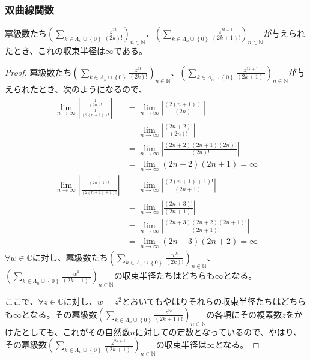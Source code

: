 \documentclass[dvipdfmx]{jsarticle}
\begin{document}
\subsubsection{双曲線関数}%
\begin{thm}\label{4.3.1.36}
冪級数たち$\left( \sum_{k \in \varLambda_{n} \cup \left\{ 0 \right\}} \frac{z^{2k}}{(2k)!} \right)_{n \in \mathbb{N}}$、$\left( \sum_{k \in \varLambda_{n} \cup \left\{ 0 \right\}} \frac{z^{2k + 1}}{(2k + 1)!} \right)_{n \in \mathbb{N}}$が与えられたとき、これの収束半径は$\infty$である。
\end{thm}
\begin{proof}
冪級数たち$\left( \sum_{k \in \varLambda_{n} \cup \left\{ 0 \right\}} \frac{z^{2k}}{(2k)!} \right)_{n \in \mathbb{N}}$、$\left( \sum_{k \in \varLambda_{n} \cup \left\{ 0 \right\}} \frac{z^{2k + 1}}{(2k + 1)!} \right)_{n \in \mathbb{N}}$が与えられたとき、次のようになるので、
\begin{align*}
\lim_{n \rightarrow \infty}\left| \frac{\frac{1}{(2n)!}}{\frac{1}{\left( 2(n + 1) \right)!}} \right| &= \lim_{n \rightarrow \infty}\left| \frac{\left( 2(n + 1) \right)!}{(2n)!} \right|\\
&= \lim_{n \rightarrow \infty}\left| \frac{(2n + 2)!}{(2n)!} \right|\\
&= \lim_{n \rightarrow \infty}\left| \frac{(2n + 2)(2n + 1)(2n)!}{(2n)!} \right|\\
&= \lim_{n \rightarrow \infty}{(2n + 2)(2n + 1)} = \infty\\
\lim_{n \rightarrow \infty}\left| \frac{\frac{1}{(2n + 1)!}}{\frac{1}{\left( 2(n + 1) + 1 \right)!}} \right| &= \lim_{n \rightarrow \infty}\left| \frac{\left( 2(n + 1) + 1 \right)!}{(2n + 1)!} \right|\\
&= \lim_{n \rightarrow \infty}\left| \frac{(2n + 3)!}{(2n + 1)!} \right|\\
&= \lim_{n \rightarrow \infty}\left| \frac{(2n + 3)(2n + 2)(2n + 1)!}{(2n + 1)!} \right|\\
&= \lim_{n \rightarrow \infty}{(2n + 3)(2n + 2)} = \infty
\end{align*}
$\forall w \in \mathbb{C}$に対し、冪級数たち$\left( \sum_{k \in \varLambda_{n} \cup \left\{ 0 \right\}} \frac{w^{k}}{(2k)!} \right)_{n \in \mathbb{N}}$、$\left( \sum_{k \in \varLambda_{n} \cup \left\{ 0 \right\}} \frac{w^{k}}{(2k + 1)!} \right)_{n \in \mathbb{N}}$の収束半径たちはどちらも$\infty$となる。\par
ここで、$\forall z \in \mathbb{C}$に対し、$w = z^{2}$とおいてもやはりそれらの収束半径たちはどちらも$\infty$となる。その冪級数$\left( \sum_{k \in \varLambda_{n} \cup \left\{ 0 \right\}} \frac{z^{2k}}{(2k + 1)!} \right)_{n \in \mathbb{N}}$の各項にその複素数$z$をかけたとしても、これがその自然数$n$に対しての定数となっているので、やはり、その冪級数$\left( \sum_{k \in \varLambda_{n} \cup \left\{ 0 \right\}} \frac{z^{2k + 1}}{(2k + 1)!} \right)_{n \in \mathbb{N}}$の収束半径は$\infty$となる。
\end{proof}
\end{document}
